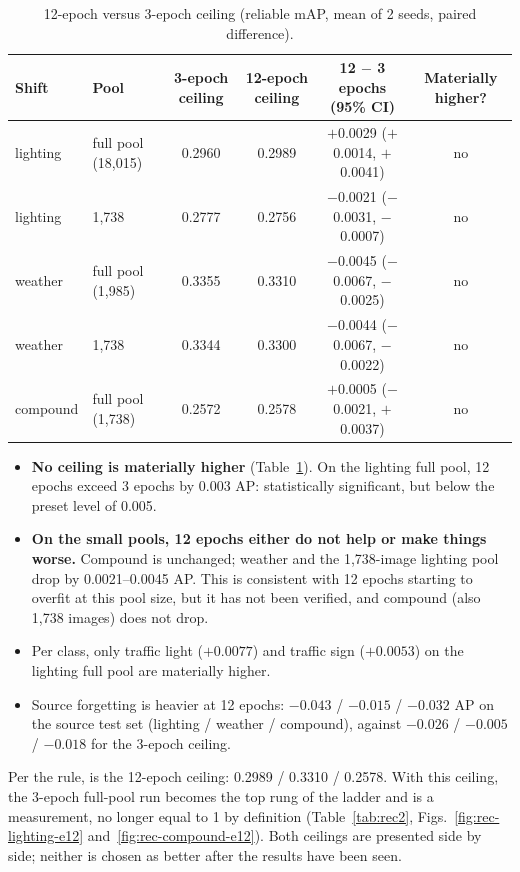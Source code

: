 \begin{table}[t]
\centering
\caption{12-epoch versus 3-epoch ceiling (reliable mAP, mean of 2 seeds, paired difference).}
\label{tab:ceil}
\footnotesize
\setlength{\tabcolsep}{3pt}
\begin{tabular}{@{}llcccc@{}}
\toprule
Shift & Pool & 3-epoch ceiling & 12-epoch ceiling & 12 $-$ 3 epochs (95\% CI) & Materially higher? \\
\midrule
lighting & full pool (18,015) & 0.2960 & 0.2989 & $+$0.0029 ($+$0.0014, $+$0.0041) & no \\
lighting & 1,738              & 0.2777 & 0.2756 & $-$0.0021 ($-$0.0031, $-$0.0007) & no \\
weather  & full pool (1,985)  & 0.3355 & 0.3310 & $-$0.0045 ($-$0.0067, $-$0.0025) & no \\
weather  & 1,738              & 0.3344 & 0.3300 & $-$0.0044 ($-$0.0067, $-$0.0022) & no \\
compound & full pool (1,738)  & 0.2572 & 0.2578 & $+$0.0005 ($-$0.0021, $+$0.0037) & no \\
\bottomrule
\end{tabular}
\end{table}

\begin{itemize}
\item \textbf{No ceiling is materially higher} (Table~\ref{tab:ceil}). On the lighting full pool, 12 epochs exceed 3 epochs by 0.003 AP: statistically significant, but below the preset level of 0.005.
\item \textbf{On the small pools, 12 epochs either do not help or make things worse.} Compound is unchanged; weather and the 1,738-image lighting pool drop by 0.0021--0.0045 AP. This is consistent with 12 epochs starting to overfit at this pool size, but it has not been verified, and compound (also 1,738 images) does not drop.
\item Per class, only traffic light ($+0.0077$) and traffic sign ($+0.0053$) on the lighting full pool are materially higher.
\item Source forgetting is heavier at 12 epochs: $-0.043$ / $-0.015$ / $-0.032$ AP on the source test set (lighting / weather / compound), against $-0.026$ / $-0.005$ / $-0.018$ for the 3-epoch ceiling.
\end{itemize}

Per the rule, \mAPc is the 12-epoch ceiling: 0.2989 / 0.3310 / 0.2578. With this ceiling, the 3-epoch full-pool run becomes the top rung of the ladder and is a measurement, no longer equal to 1 by definition (Table~\ref{tab:rec2}, Figs.~\ref{fig:rec-lighting-e12} and~\ref{fig:rec-compound-e12}). Both ceilings are presented side by side; neither is chosen as better after the results have been seen.

